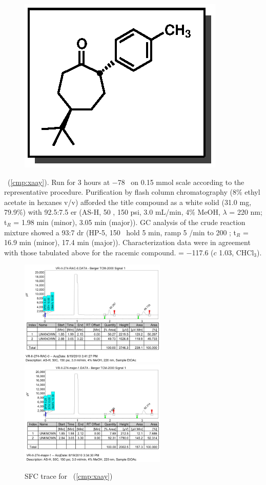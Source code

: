 \pagebreak
\begin{figure}
  \vspace{-22pt}
  \begin{center}
    \includegraphics[scale=0.8]{chp_asymmetric/images/xaax}
  \end{center}
  \vspace{-30pt}
\end{figure}\noindent \textbf{\CMPxaay}\ (\ref{cmp:xaay}). Run for 3 hours
at $-$78 \degc\  on 0.15 mmol scale according to the representative procedure.
Purification by flash column chromatography (8\% ethyl acetate in hexanes v/v)
afforded the title compound as a white solid (31.0 mg, 79.9\%) with 92.5:7.5 er
(AS-H, 50 \degc, 150 psi, 3.0 mL/min, 4\% MeOH, $\lambda$ = 220 nm; t$_R$ = 1.98
min (minor), 3.05 min (major)). GC analysis of the crude reaction mixture showed
a 93:7 dr (HP-5, 150 \degc\ hold 5 min, ramp 5 \degc/min to 200 \degc; t$_R$ =
16.9 min (minor), 17.4 min (major)). Characterization data were in agreement with those tabulated above for the racemic compound. \rotation = $-$117.6 ($c$ 1.03, CHCl$_3$).
\\
\begin{figure}[h]
\centering
\includegraphics[width=2.75in]{chp_asymmetric/images/sfc/xaay-rac.png}
\includegraphics[width=2.75in]{chp_asymmetric/images/sfc/xaay.png}
\caption{SFC trace for \CMPxaay~(\ref{cmp:xaay})}
\vspace{-10pt}
\end{figure}
